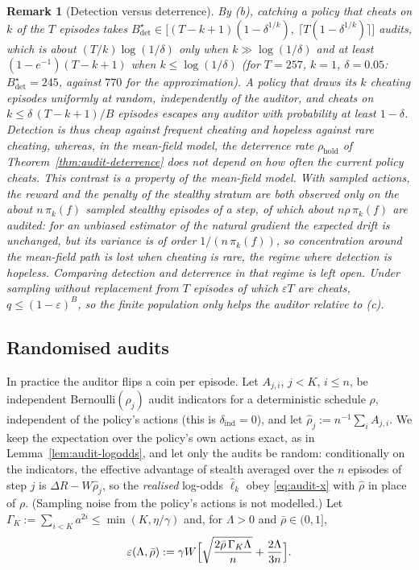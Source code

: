 \documentclass[11pt,a4paper]{article}
\newtheorem{remark}[theorem]{Remark}
\begin{document}
\begin{remark}[Detection versus deterrence]\label{rem:audit-detect-deter}
By (b), catching a policy that cheats on $k$ of the $T$ episodes takes
$B^\star_{\det}\in\bigl[(T-k+1)(1-\delta^{1/k}),\ \lceil T(1-\delta^{1/k})\rceil\bigr]$ audits, which is about $(T/k)\log(1/\delta)$ only when $k\gg\log(1/\delta)$ and at least $(1-e^{-1})(T-k+1)$ when $k\le\log(1/\delta)$ (for $T=257$, $k=1$, $\delta=0.05$: $B^\star_{\det}=245$, against $770$ for the approximation). A policy that draws its $k$ cheating episodes uniformly at random, independently of the auditor, and cheats on
$k\le\delta\,(T-k+1)/B$ episodes escapes any auditor with probability at least
$1-\delta$. Detection is thus cheap against frequent cheating and hopeless
against rare cheating, whereas, in the mean-field model, the deterrence rate $\rho_{\mathrm{hold}}$ of
Theorem~\ref{thm:audit-deterrence} does not depend on how often the current
policy cheats. This contrast is a property of the mean-field model. With sampled actions, the reward and the penalty of the stealthy stratum are both observed only on the about $n\,\pi_k(f)$ sampled stealthy episodes of a step, of which about $n\rho\,\pi_k(f)$ are audited: for an unbiased estimator of the natural gradient the expected drift is unchanged, but its variance is of order $1/(n\,\pi_k(f))$, so concentration around the mean-field path is lost when cheating is rare, the regime where detection is hopeless. Comparing detection and deterrence in that regime is left open. Under sampling without replacement from $T$ episodes of which
$\varepsilon T$ are cheats, $q\le(1-\varepsilon)^B$, so the finite population
only helps the auditor relative to (c).
\end{remark}

\subsection{Randomised audits}

In practice the auditor flips a coin per episode. Let $A_{j,i}$,
$j<K$, $i\le n$, be independent Bernoulli$(\rho_j)$ audit indicators for a
deterministic schedule $\rho$, independent of the policy's actions (this is
$\delta_{\mathrm{ind}}=0$), and let $\hat\rho_j:=n^{-1}\sum_iA_{j,i}$. We keep
the expectation over the policy's own actions exact, as in
Lemma~\ref{lem:audit-logodds}, and let only the audits be random: conditionally
on the indicators, the effective advantage of stealth averaged over the $n$
episodes of step $j$ is $\Delta R-W\hat\rho_j$, so the \emph{realised}
log-odds $\hat\ell_k$ obey \eqref{eq:audit-x} with $\hat\rho$ in place of $\rho$.
(Sampling noise from the policy's actions is not modelled.) Let
$\Gamma_K:=\sum_{i<K}a^{2i}\le\min(K,\eta/\gamma)$ and, for $\Lambda>0$ and
$\bar\rho\in(0,1]$,
\[
  \varepsilon(\Lambda,\bar\rho):=\gamma W\Bigl[\sqrt{\frac{2\bar\rho\,\Gamma_K\Lambda}{n}}
  +\frac{2\Lambda}{3n}\Bigr].
\]
\end{document}
